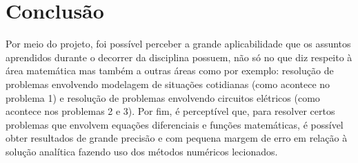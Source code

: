 \documentclass[12pt]{article}%
\begin{document}
\newpage
\section{Conclusão}
    Por meio do projeto, foi possível perceber a grande aplicabilidade que os assuntos aprendidos durante o decorrer da disciplina possuem, não
    só no que diz respeito à área matemática mas também a outras áreas como por exemplo: resolução de problemas envolvendo modelagem de situações
    cotidianas (como acontece no problema 1) e resolução de problemas envolvendo circuitos elétricos (como acontece nos problemas 2 e 3). Por fim, é perceptível que, para resolver certos problemas que envolvem equações diferenciais e funções matemáticas, é possível obter resultados de grande precisão e com pequena margem de erro em relação à solução analítica fazendo uso dos métodos numéricos lecionados.
\end{document}
